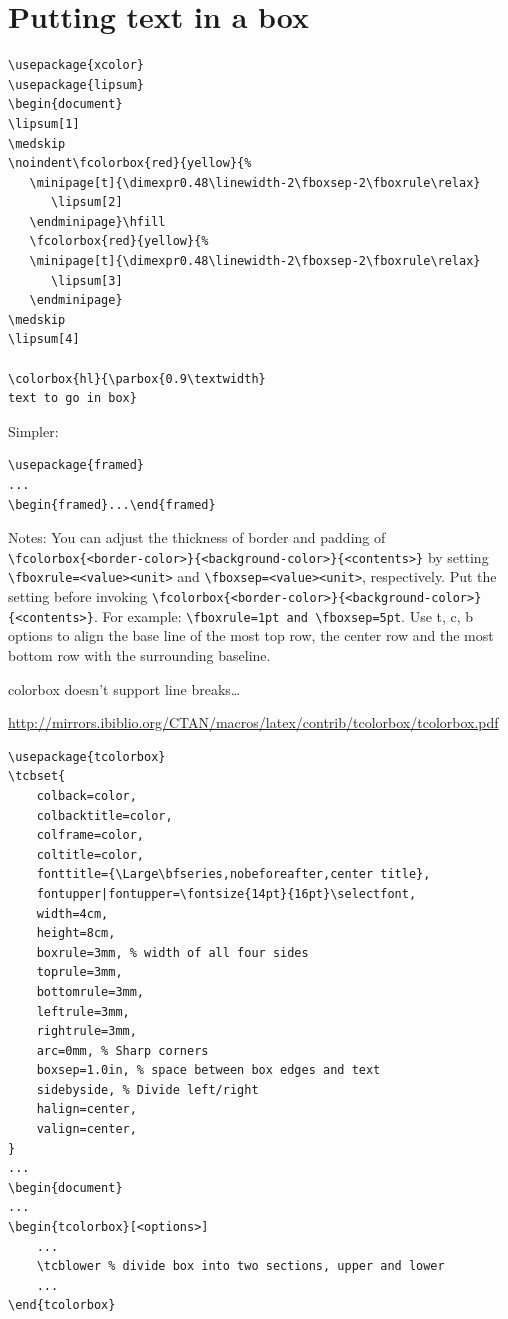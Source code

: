 \documentclass{article}
\begin{document}
\section{Putting text in a box}
\begin{lstlisting}
\usepackage{xcolor}
\usepackage{lipsum}
\begin{document}
\lipsum[1]
\medskip
\noindent\fcolorbox{red}{yellow}{%
   \minipage[t]{\dimexpr0.48\linewidth-2\fboxsep-2\fboxrule\relax}
      \lipsum[2]
   \endminipage}\hfill
   \fcolorbox{red}{yellow}{%
   \minipage[t]{\dimexpr0.48\linewidth-2\fboxsep-2\fboxrule\relax}
      \lipsum[3]
   \endminipage}
\medskip
\lipsum[4]

\colorbox{hl}{\parbox{0.9\textwidth}
text to go in box}

\end{lstlisting}

Simpler:
\begin{lstlisting}
\usepackage{framed}
...
\begin{framed}...\end{framed}
\end{lstlisting}



Notes:
You can adjust the thickness of border and padding of
\verb|\fcolorbox{<border-color>}{<background-color>}{<contents>}|
by setting \verb|\fboxrule=<value><unit>| and
\verb|\fboxsep=<value><unit>|, respectively. Put the setting
before invoking
\verb|\fcolorbox{<border-color>}{<background-color>}{<contents>}|.
For example: \verb|\fboxrule=1pt and \fboxsep=5pt|. Use
\textrm{t}, \textrm{c}, \textrm{b}
options to align the base line of the most top row,
the center row and the most bottom row with the surrounding baseline.

colorbox doesn't support line breaks\ldots

\url{http://mirrors.ibiblio.org/CTAN/macros/latex/contrib/tcolorbox/tcolorbox.pdf}
\begin{lstlisting}
\usepackage{tcolorbox}
\tcbset{
    colback=color,
    colbacktitle=color,
    colframe=color,
    coltitle=color,
    fonttitle={\Large\bfseries,nobeforeafter,center title},
    fontupper|fontupper=\fontsize{14pt}{16pt}\selectfont,
    width=4cm,
    height=8cm,
    boxrule=3mm, % width of all four sides
    toprule=3mm,
    bottomrule=3mm,
    leftrule=3mm,
    rightrule=3mm,
    arc=0mm, % Sharp corners
    boxsep=1.0in, % space between box edges and text
    sidebyside, % Divide left/right
    halign=center,
    valign=center,
}
...
\begin{document}
...
\begin{tcolorbox}[<options>]
    ...
    \tcblower % divide box into two sections, upper and lower
    ...
\end{tcolorbox}
\end{lstlisting}
\end{document}
